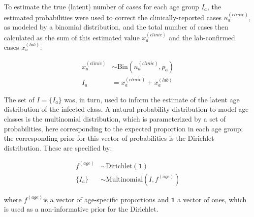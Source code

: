 To estimate the true (latent) number of cases for each age group \(I_a\), the estimated probabilities were used to correct the clinically-reported cases \(n_a^{(clinic)}\), as modeled by a binomial distribution, and the total number of cases then calculated as the sum of this estimated value \(x_a^{(clinic)}\) and the lab-confirmed cases \(x_a^{(lab)}\):

\begin{equation}
\begin{split}
x_a^{(clinic)} &\sim \text{Bin}(n_a^{(clinic)},p_a) \\
I_a &= x_a^{(clinic)}+x_a^{(lab)}
\end{split}
\end{equation}

The set of \(I = \{I_a\}\) was, in turn, used to inform the estimate of the latent age distribution of the infected class. A natural probability distribution to model age classes is the multinomial distribution, which is parameterized by a set of probabilities, here corresponding to the expected proportion in each age group; the corresponding prior for this vector of probabilities is the  Dirichlet distribution. These are specified by:

\begin{equation}
\begin{aligned}
f^{(age)} &\sim \text{Dirichlet}(\mathbf{1}) \\
\{I_a\} &\sim \text{Multinomial}(I, f^{(age)})
\end{aligned}
\end{equation}

where \(f^{(age)}\)is a vector of age-specific proportions and \(\mathbf{1}\) a vector of ones, which is used as a non-informative prior for the Dirichlet.
